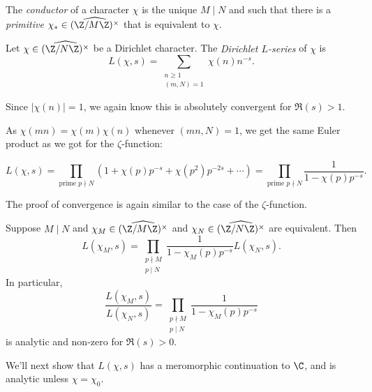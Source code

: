 \documentclass[a4paper]{article}
\begin{document}
\begin{defi}[Conductor]
  The \emph{conductor} of a character $\chi$ is the unique $M \mid N$ and such that there is a \emph{primitive} $\chi_* \in \widehat{(\Z/M\Z)^\times}$ that is equivalent to $\chi$.
\end{defi}

\begin{defi}
  Let $\chi \in \widehat{(\Z/N\Z)^\times}$ be a Dirichlet character. The \emph{Dirichlet $L$-series} of $\chi$ is
  \[
    L(\chi, s) = \sum_{\substack{n \geq 1\\(m, N) = 1}} \chi(n) n^{-s}.
  \]
\end{defi}
Since $|\chi(n)| = 1$, we again know this is absolutely convergent for $\Re(s) > 1$.

As $\chi(mn) = \chi(m)\chi(n)$ whenever $(mn, N) = 1$, we get the same Euler product as we got for the $\zeta$-function:
\begin{prop}
  \[
    L(\chi, s) = \prod_{\text{prime }p \nmid N} (1 + \chi(p) p^{-s} + \chi(p^2) p^{-2s} + \cdots) = \prod_{\text{prime }p \nmid N} \frac{1}{1 - \chi(p) p^{-s}}.
  \]
\end{prop}
The proof of convergence is again similar to the case of the $\zeta$-function.

\begin{prop}
  Suppose $M \mid N$ and $\chi_M \in \widehat{(\Z/M\Z)^\times}$ and $\chi_N \in \widehat{(\Z/N\Z)^\times}$ are equivalent. Then
  \[
    L(\chi_M, s) = \prod_{\substack{p \nmid M\\ p \mid N}} \frac{1}{1 - \chi_M(p) p^{-s}} L(\chi_N, s).
  \]
  In particular,
  \[
    \frac{L(\chi_M, s)}{ L(\chi_N, s)} = \prod_{\substack{p \nmid M\\ p \mid N}} \frac{1}{1 - \chi_M(p) p^{-s}}
  \]
  is analytic and non-zero for $\Re(s) > 0$.
\end{prop}

We'll next show that $L(\chi, s)$ has a meromorphic continuation to $\C$, and is analytic unless $\chi = \chi_0$.
\end{document}
